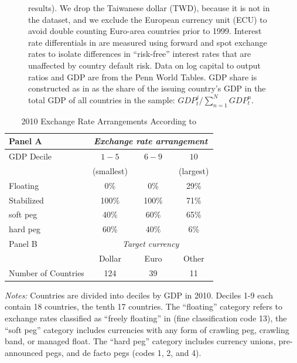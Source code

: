 \begin{figure}
\begin{minipage}{\linewidth}
    results). We drop the Taiwanese dollar (TWD), because it is not in
    the \citet{ilzetzki2018exchange} dataset, and we exclude the
    European currency unit (ECU) to avoid double counting Euro-area
    countries prior to 1999. Interest rate differentials in
    \citet{HassanMano2015} are measured using forward and spot
    exchange rates to isolate differences in ``risk-free'' interest
    rates that are unaffected by country default risk. Data on log
    capital to output ratios and GDP are from the Penn World Tables.
    GDP share is constructed as in \cite{Hassan2013} as the share of
    the issuing country's GDP in the total GDP of all countries in the
    sample: $GDP^j_t / \sum^N_{n = 1} GDP^n_t$.
  \end{minipage}
\end{figure}

\clearpage

\begin{table}[]
  \caption{2010 Exchange Rate Arrangements According to
    \citet*{ilzetzki2018exchange}\label{ta:RR}}
  \begin{center}
    \begin{tabular}{lccc}
      \hline \hline
      Panel A & \multicolumn{3}{c}{\textit{Exchange rate arrangement}} \\
      \midrule
      GDP Decile & $\quad 1 - 5 \quad$  & $\quad 6 - 9 \quad$ & $10$ \\
              &(smallest)&&(largest)\\
      \midrule
      Floating & 0\% & 0\% & 29\%\\
      Stabilized & 100\% & 100\% & 71\% \\
      \phantom{of which }soft peg & 40\% & 60\% & 65\%\\
      \phantom{of which }hard peg & 60\% & 40\% & 6\%\\
      \midrule
      Panel B & \multicolumn{3}{c}{\textit{Target currency}} \\
      \midrule
              & Dollar & Euro & Other \\
      Number of Countries          & 124   & 39 & 11 \\
      \hline \hline
    \end{tabular}
  \end{center}
  \small\textit{Notes: }Countries are divided into deciles by GDP in
  2010. Deciles 1-9 each contain 18 countries, the tenth 17 countries.
  The ``floating'' category refers to exchange rates classified as
  ``freely floating'' in \citet*{ilzetzki2018exchange} (fine
  classification code 13), the ``soft peg'' category includes
  currencies with any form of crawling peg, crawling band, or managed
  float. The ``hard peg'' category includes currency unions,
  pre-announced pegs, and de facto pegs (codes 1, 2, and 4).
\end{table}


